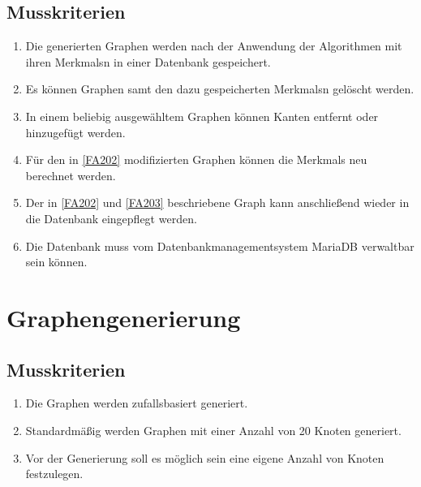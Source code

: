\documentclass[13pt]{scrreprt}
\newcounter{tempcounter1}
\newcounter{tempcounter2}
\newcounter{tempcounter3}
\newcounter{tempcounter4}
\newcounter{tempcounter5}
\newcounter{tempcounter6}
\newcounter{tempcounter7}
\newcounter{tempcounter8}
\newcounter{tempcounter9}
\begin{document}
\subsection{Musskriterien}
\begin{addmargin}[25pt]{0pt}
\begin{enumerate} [label=FA\arabic*,start=200]
	\item \label{FA200}Die generierten Graphen werden nach der Anwendung der Algorithmen mit ihren \Glspl{Merkmal}n in einer Datenbank gespeichert.
	\item \label{FA201}Es können Graphen samt den dazu gespeicherten \Glspl{Merkmal}n gelöscht werden.
	\item \label{FA202}In einem beliebig ausgewähltem Graphen können Kanten entfernt oder hinzugefügt werden.
	\item \label{FA203}Für den in \ref{FA202} modifizierten Graphen können die \Glspl{Merkmal} neu berechnet werden.
	\item \label{FA204}Der in \ref{FA202} und \ref{FA203} beschriebene Graph kann anschließend wieder in die Datenbank eingepflegt werden.
    \item \label{FA205}Die Datenbank muss vom Datenbankmanagementsystem MariaDB verwaltbar sein können.
\setcounter{tempcounter4}{\value{enumi}}
\end{enumerate}
\end{addmargin}
\addtocounter{tempcounter4}{1}

\section{Graphengenerierung}
\subsection{Musskriterien}
\begin{addmargin}[25pt]{0pt}
\begin{enumerate} [label=FA\arabic*,start=300]
	\item \label{FA300}Die Graphen werden zufallsbasiert generiert.
	\item Standardmäßig werden Graphen mit einer Anzahl von 20 Knoten generiert.
	\item Vor der Generierung soll es möglich sein eine eigene Anzahl von Knoten festzulegen.
\setcounter{tempcounter5}{\value{enumi}}
\end{enumerate}
\end{addmargin}
\end{document}
